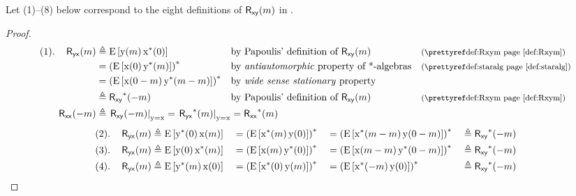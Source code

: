 \begin{lemma}
\label{lem:Rxy}
Let (1)--(8) below correspond to the eight definitions of $\operatorname{\mathsf{R}_{\mathsf{xy}}}(m)$ in .
\end{lemma}
\begin{proof}
\begin{align*}
    (1).\quad\Ryx(m)
      &\eqd \pE\brs{\rvy(m)\rvx^\ast(0)}
      && \text{by Papoulis' definition of $\Rxy(m)$}                           && \text{\xref{def:Rxym}}
    \\&= \brp{\pE\brs{\rvx(0)\rvy^\ast(m)}}^\ast
      && \text{by \prope{antiautomorphic} property of *-algebras}              && \text{\xref{def:staralg}}
    \\&= \brp{\pE\brs{\rvx(0-m)\rvy^\ast(m-m)}}^\ast
      && \text{by \prope{wide sense stationary} property}
    \\&\eqd \Rxy^\ast(-m)
      && \text{by Papoulis' definition of $\Rxy(m)$}                           && \text{\xref{def:Rxym}}
    \\
    \Rxx(-m)
      &\eqd \mathrlap{\brlr{\Rxy(-m)}_{\rvy=\rvx}
       = \brlr{\Ryx^\ast(m)}_{\rvy=\rvx}
       = \Rxx^\ast(m)}
\end{align*}
\begin{align*}
    (2).\quad\Ryx(m)
      &\eqd \pE\brs{\rvy^\ast(0)\rvx(m)}
     &&=\brp{\pE\brs{\rvx^\ast(m)\rvy(0)}}^\ast
     &&=\brp{\pE\brs{\rvx^\ast(m-m)\rvy(0-m)}}^\ast
     &&\eqd \Rxy^\ast(-m)
    \\
    (3).\quad\Ryx(m)
      &\eqd \pE\brs{\rvy(0)\rvx^\ast(m)}
     &&=\brp{\pE\brs{\rvx(m)\rvy^\ast(0)}}^\ast
     &&=\brp{\pE\brs{\rvx(m-m)\rvy^\ast(0-m)}}^\ast
     &&\eqd \Rxy^\ast(-m)
    \\
    (4).\quad\Ryx(m)
      &\eqd \pE\brs{\rvy^\ast(m)\rvx(0)}
     &&=\brp{\pE\brs{\rvx^\ast(0)\rvy(m)}}^\ast
     &&=\brp{\pE\brs{\rvx^\ast(-m)\rvy(0)}}^\ast
     &&\eqd \Rxy^\ast(-m)

\end{align*}
\end{proof}

